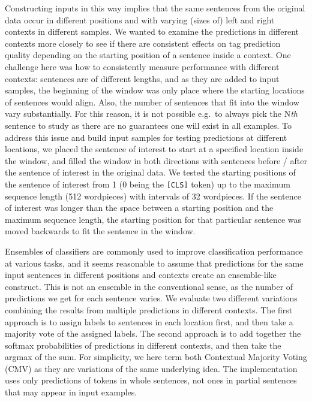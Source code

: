 \documentclass[11pt]{article}
\begin{document}
Constructing inputs in this way implies that the same sentences from the original data occur in different positions and with varying (sizes of) left and right contexts in different samples. We wanted to examine the predictions in different contexts more closely to see if there are consistent effects on tag prediction quality depending on the starting position of a sentence inside a context. One challenge here was how to consistently measure performance with different contexts: sentences are of different lengths, and as they are added to input samples, the beginning of the window was only place where the starting locations of sentences would align. Also, the number of sentences that fit into the window vary substantially. For this reason, it is not possible e.g.\ to always pick the N\emph{th} sentence to study as there are no guarantees one will exist in all examples. To address this issue and build input samples for testing predictions at different locations, we placed the sentence of interest to start at a specified location inside the window, and filled the window in both directions with sentences before / after the sentence of interest in the original data. We tested the starting positions of the sentence of interest from 1 (0 being the \texttt{[CLS]} token) up to the maximum sequence length (512 wordpieces) with intervals of 32 wordpieces. If the sentence of interest was longer than the space between a starting position and the maximum sequence length, the starting position for that particular sentence was moved backwards to fit the sentence in the window. 

Ensembles of classifiers are commonly used to improve classification performance at various tasks, and it seems reasonable to assume that predictions for the same input sentences in different positions and contexts create an ensemble-like construct. This is not an ensemble in the conventional sense, as the number of predictions we get for each sentence varies.
We evaluate two different variations combining the results from multiple predictions in different contexts. The first approach is to assign labels to sentences in each location first, and then take a majority vote of the assigned labels. The second approach is to add together the softmax probabilities of predictions in different contexts, and then take the argmax of the sum. For simplicity, we here term both Contextual Majority Voting (CMV) as they are variations of the same underlying idea. The implementation uses only predictions of tokens in whole sentences, not ones in partial sentences that may appear in input examples. 
\end{document}
